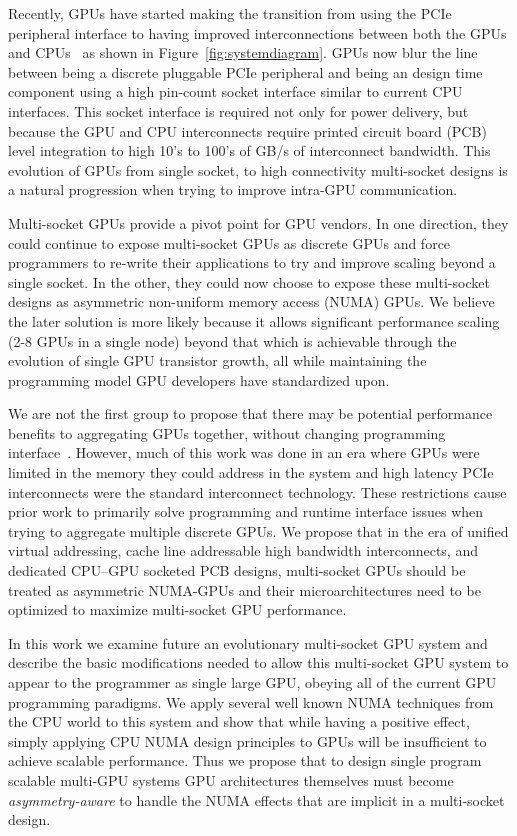 Recently, GPUs have started making the transition from using the PCIe peripheral 
interface
to having improved interconnections between both the GPUs and 
CPUs~\cite{dgx,AMDINFINITYFABRIC}
as shown in Figure~\ref{fig:systemdiagram}.  GPUs now blur the line between 
being
a discrete pluggable PCIe peripheral and being an design time component using a 
high pin-count
socket interface similar to current CPU interfaces.  This socket interface is required
not only for power delivery, but because the GPU and CPU interconnects require printed
circuit board (PCB) level integration to high 10's to 100's of GB/s of interconnect bandwidth.
This evolution of GPUs from single socket, to high connectivity multi-socket designs
is a natural progression when trying to improve intra-GPU communication.

Multi-socket GPUs provide a pivot point for GPU vendors.  In one direction, they
could continue to expose multi-socket GPUs as discrete GPUs and force programmers
to re-write their applications to try and improve scaling beyond a single socket.
In the other, they could now choose to expose these multi-socket designs as asymmetric
non-uniform memory access (NUMA) GPUs.  We believe the later solution is more likely
because it allows significant performance scaling (2-8 GPUs in a single node) beyond
that which is achievable through the evolution of single GPU transistor growth, all
while maintaining the programming model GPU developers have standardized upon.

We are not the first group to propose that there may be potential performance
benefits to aggregating GPUs together, without changing programming 
interface~\cite{Cabezas2015,lee2013transparent,XXX,XXX}. However, much of this work
was done in an era where GPUs were limited in the memory they could address
in the system and high latency PCIe interconnects were the standard interconnect
technology.  These restrictions cause prior work to primarily solve programming and runtime
interface issues when trying to aggregate multiple discrete GPUs.  We propose
that in the era of unified virtual addressing, cache line addressable high bandwidth
interconnects, and dedicated CPU--GPU socketed PCB designs, multi-socket GPUs
should be treated as asymmetric NUMA-GPUs and their microarchitectures need to be optimized
to maximize multi-socket GPU performance.

In this work we examine future an evolutionary multi-socket GPU system and describe the 
basic modifications needed to allow this multi-socket GPU system to appear to the programmer
as single large GPU, obeying all of the current GPU programming paradigms. We apply 
several well known NUMA techniques from the CPU world to this system and show that
while having a positive effect, simply applying CPU NUMA design principles to GPUs 
will be insufficient to achieve scalable performance.  Thus we propose that to design
single program scalable multi-GPU systems GPU architectures themselves must become
\textit{asymmetry-aware} to handle the NUMA effects that are implicit in a multi-socket
design.

